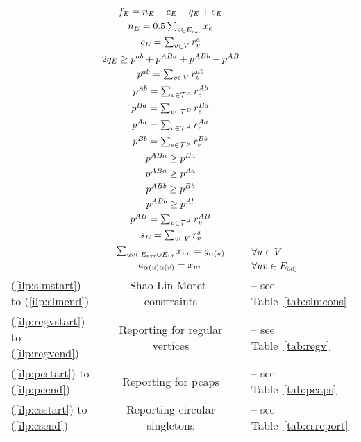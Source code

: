 \documentclass[runningheads]{llncs}
\begin{document}
\begin{algorithm}
\begin{constraints}
\begin{tabular}{lcl}
	\cns & $f_E = n_E - c_E + q_E + s_E$\\
	\cns & $n_E = 0.5 \sum_{e \in E_{\text{ext}}} x_{e}$\\
    \cns & $c_E = \sum_{v\in V} r^c_{v}$\\
    \cns & $2q_E \geq p^{a b}+ p^{ABa} + p^{ABb} - p^{A B} $\\
    \cns & $p^{a b} = \sum_{v \in V}r^{a b}_{v}$\\
    \cns & $p^{A b} = \sum_{v \in \mathcal{T}^A} r^{A b}_e$\\
    \cns & $p^{B a} = \sum_{v\in \mathcal{T}^B} r^{B a}_e$\\
    \cns & $p^{A a} = \sum_{v \in \mathcal{T}^A} r^{A a}_e$\\
    \cns & $p^{B b} = \sum_{e \in \mathcal{T}^B} r^{B b}_e$\\
    \cns & $p^{ABa} \geq p^{B a}$\\
    \cns & $p^{ABa} \geq p^{A a}$\\
    \cns & $p^{ABb} \geq p^{B b}$\\
    \cns & $p^{ABb} \geq p^{A b}$\\
    \cns & $p^{A B} = \sum_{v\in \mathcal{T}^A} r^{A B}_v$\\
    \cns & $s_E = \sum_{v\in V} r^{s}_{v}$ \\
    \cns & $\sum_{uv\in E_{ext} \cup E_{id} } x_{uv}= g_{\alpha(u)}$ & $\forall u\in V$  \\
    \cns & $a_{\alpha(u)\alpha(v)} = x_{uv}$ & $\forall uv \in E_\text{adj}$ \\

    (\ref{ilp:slmstart}) to (\ref{ilp:slmend})& Shao-Lin-Moret~\cite{SHA-LIN-MOR-2015} constraints& -- see Table~\ref{tab:slmcons}\\
    (\ref{ilp:regvstart}) to (\ref{ilp:regvend})& Reporting for regular vertices& -- see Table~\ref{tab:regv}\\
    (\ref{ilp:pcstart}) to (\ref{ilp:pcend})& Reporting for \gls{pcaps}& -- see Table~\ref{tab:pcaps}\\
    (\ref{ilp:csstart}) to (\ref{ilp:csend})& Reporting circular singletons& --  see Table~\ref{tab:csreport}\\    
\end{tabular}

\end{constraints}
\end{algorithm}
\end{document}
